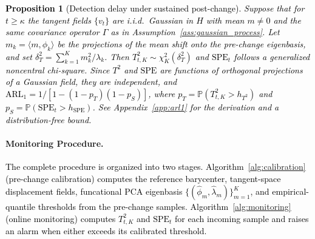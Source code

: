 \documentclass{article}
\newcommand{\rev}[1]{\textcolor{black}{#1}}
\theoremstyle{plain}
\newtheorem{proposition}[theorem]{Proposition}
\theoremstyle{definition}
\theoremstyle{remark}
\begin{document}
\rev{
\begin{proposition}[Detection delay under sustained post-change]\label{prop:arl1}
Suppose that for $t \ge \kappa$ the tangent fields $\{v_t\}$ are
i.i.d.\ Gaussian in $H$ with mean $m \neq 0$ and the same covariance
operator $\Gamma$ as in Assumption~\ref{ass:gaussian_process}.
Let $m_k = \langle m, \phi_k \rangle$ be the projections of the
mean shift onto the pre-change eigenbasis, and set
$\delta_T^2 = \sum_{k=1}^{K} m_k^2 / \lambda_k$.
Then $T^2_{t,K} \sim \chi^2_K(\delta_T^2)$ and $\mathrm{SPE}_t$
follows a generalized noncentral chi-square.
Since $T^2$ and $\mathrm{SPE}$ are functions of orthogonal
projections of a Gaussian field, they are independent, and
$\mathrm{ARL}_1 = 1/[1-(1-p_T)(1-p_S)]$,
where $p_T = \mathbb{P}(T^2_{t,K} > h_{T^2})$ and
$p_S = \mathbb{P}(\mathrm{SPE}_t > h_{\mathrm{SPE}})$.
See Appendix~\ref{app:arl1} for the derivation and a
distribution-free bound.
\end{proposition}
}

\paragraph{Monitoring Procedure.}
\rev{The complete procedure is organized into two stages. Algorithm~\ref{alg:calibration} (pre-change calibration) computes the reference barycenter, tangent-space displacement fields,  funcational PCA eigenbasis $\{(\widehat\phi_m, \widehat\lambda_m)\}_{m=1}^K$, and empirical-quantile thresholds from the pre-change samples. Algorithm~\ref{alg:monitoring} (online monitoring) computes $T_{t,K}^2$ and $\mathrm{SPE}_t$ for each incoming sample and raises an alarm when either exceeds its calibrated threshold.}
\end{document}
